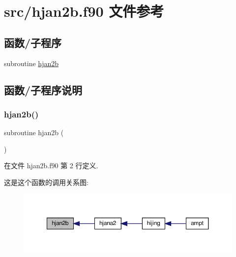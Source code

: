 \hypertarget{hjan2b_8f90}{}\section{src/hjan2b.f90 文件参考}
\label{hjan2b_8f90}
\subsection*{函数/子程序}
\begin{DoxyCompactItemize}
\item 
subroutine \mbox{\hyperlink{hjan2b_8f90_a37848c0c847102e7941c311c5af2c3ad}{hjan2b}}
\end{DoxyCompactItemize}


\subsection{函数/子程序说明}
\mbox{\label{hjan2b_8f90_a37848c0c847102e7941c311c5af2c3ad}} 
\subsubsection{\texorpdfstring{hjan2b()}{hjan2b()}}
{\footnotesize\ttfamily subroutine hjan2b (\begin{DoxyParamCaption}{ }\end{DoxyParamCaption})}



在文件 hjan2b.\+f90 第 2 行定义.

这是这个函数的调用关系图\+:
\nopagebreak
\begin{figure}[H]
\begin{center}
\leavevmode
\includegraphics[width=350pt]{hjan2b_8f90_a37848c0c847102e7941c311c5af2c3ad_icgraph}
\end{center}
\end{figure}
